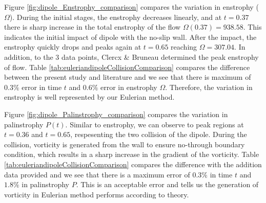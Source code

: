 

Figure \ref{fig:dipole_Enstrophy_comparison} compares the variation in enstrophy ($\Omega$). During the initial stages, the enstrophy decreases linearly, and at $t=0.37$ there is sharp increase in the total enstrophy of the flow $\Omega(0.37) = 938.58$. This indicates the initial impact of dipole with the no-slip wall. After the impact, the enstrophy quickly drops and peaks again at $t=0.65$ reaching $\Omega = 307.04$. In addition, to the 3 data points, Clercx \& Bruneau determined the peak enstrophy of flow. Table \ref{tab:euleriandipoleCollisionComparison} compares the difference between the present study and literature and we see that there is maximum of $0.3\%$ error in time $t$ and $0.6\%$ error in enstrophy $\Omega$. Therefore, the variation in enstrophy is well represented by our Eulerian method.

Figure \ref{fig:dipole_Palinstrophy_comparison} compares the variation in palinstrophy $P(t)$. Similar to enstrophy, we can observe to peak regions at $t=0.36$ and $t=0.65$, respesenting the two collision of the dipole. During the collision, vorticity is generated from the wall to ensure no-through boundary condition, which results in a sharp increase in the gradient of the vorticity. Table \ref{tab:euleriandipoleCollisionComparison} compares the difference with the addition data provided and we see that there is a maximum error of $0.3\%$ in time $t$ and $1.8\%$ in palinstrophy $P$. This is an acceptable error and tells us the generation of vorticity in Eulerian method performs according to theory.
	
